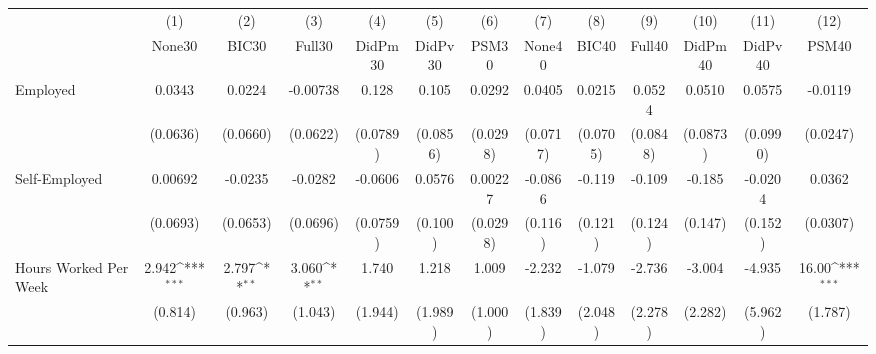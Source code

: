 {
\def\sym#1{\ifmmode^{#1}\else\(^{#1}\)\fi}
\begin{tabular}{l*{12}{c}}
\toprule
            &\multicolumn{1}{c}{(1)}&\multicolumn{1}{c}{(2)}&\multicolumn{1}{c}{(3)}&\multicolumn{1}{c}{(4)}&\multicolumn{1}{c}{(5)}&\multicolumn{1}{c}{(6)}&\multicolumn{1}{c}{(7)}&\multicolumn{1}{c}{(8)}&\multicolumn{1}{c}{(9)}&\multicolumn{1}{c}{(10)}&\multicolumn{1}{c}{(11)}&\multicolumn{1}{c}{(12)}\\
            &\multicolumn{1}{c}{None30}&\multicolumn{1}{c}{BIC30}&\multicolumn{1}{c}{Full30}&\multicolumn{1}{c}{DidPm30}&\multicolumn{1}{c}{DidPv30}&\multicolumn{1}{c}{PSM30}&\multicolumn{1}{c}{None40}&\multicolumn{1}{c}{BIC40}&\multicolumn{1}{c}{Full40}&\multicolumn{1}{c}{DidPm40}&\multicolumn{1}{c}{DidPv40}&\multicolumn{1}{c}{PSM40}\\
\midrule
Employed    &      0.0343         &      0.0224         &    -0.00738         &       0.128         &       0.105         &      0.0292         &      0.0405         &      0.0215         &      0.0524         &      0.0510         &      0.0575         &     -0.0119         \\
            &    (0.0636)         &    (0.0660)         &    (0.0622)         &    (0.0789)         &    (0.0856)         &    (0.0298)         &    (0.0717)         &    (0.0705)         &    (0.0848)         &    (0.0873)         &    (0.0990)         &    (0.0247)         \\
\addlinespace
Self-Employed&     0.00692         &     -0.0235         &     -0.0282         &     -0.0606         &      0.0576         &     0.00227         &     -0.0866         &      -0.119         &      -0.109         &      -0.185         &     -0.0204         &      0.0362         \\
            &    (0.0693)         &    (0.0653)         &    (0.0696)         &    (0.0759)         &     (0.100)         &    (0.0298)         &     (0.116)         &     (0.121)         &     (0.124)         &     (0.147)         &     (0.152)         &    (0.0307)         \\
\addlinespace
Hours Worked Per Week&       2.942\sym{***}&       2.797\sym{**} &       3.060\sym{**} &       1.740         &       1.218         &       1.009         &      -2.232         &      -1.079         &      -2.736         &      -3.004         &      -4.935         &       16.00\sym{***}\\
            &     (0.814)         &     (0.963)         &     (1.043)         &     (1.944)         &     (1.989)         &     (1.000)         &     (1.839)         &     (2.048)         &     (2.278)         &     (2.282)         &     (5.962)         &     (1.787)         \\

\end{tabular}}
